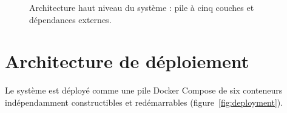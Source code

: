 \begin{figure}[H]
{}
\caption{Architecture haut niveau du système : pile à cinq couches et dépendances externes.}
\label{fig:architecture_overview}
\end{figure}

\section{Architecture de déploiement}

Le système est déployé comme une pile Docker Compose de six conteneurs indépendamment constructibles et redémarrables (figure~\ref{fig:deployment}).

